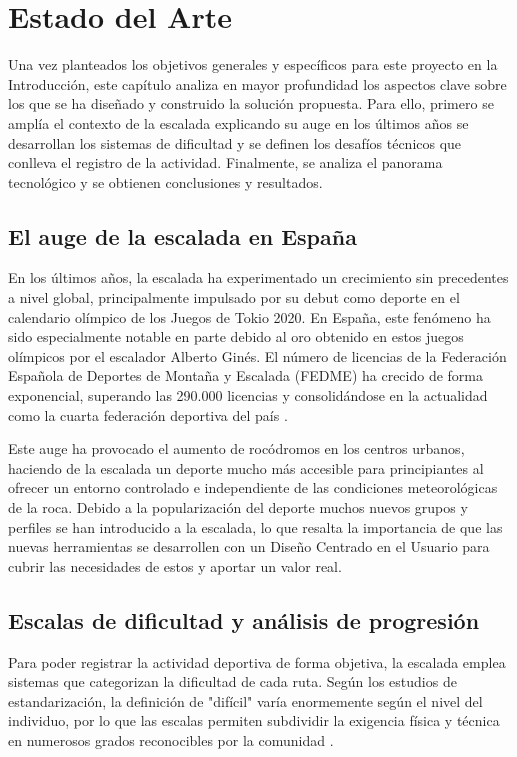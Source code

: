 \chapter{Estado del Arte}
\label{cap:estadoDelArte}

Una vez planteados los objetivos generales y específicos para este proyecto en la Introducción, este capítulo analiza en mayor profundidad los aspectos clave sobre los que se ha diseñado y construido la solución propuesta. Para ello, primero se amplía el contexto de la escalada explicando su auge en los últimos años se desarrollan los sistemas de dificultad y se definen los desafíos técnicos que conlleva el registro de la actividad. Finalmente, se analiza el panorama tecnológico y se obtienen conclusiones y resultados.

\section{El auge de la escalada en España}

En los últimos años, la escalada ha experimentado un crecimiento sin precedentes a nivel global, principalmente impulsado por su debut como deporte en el calendario olímpico de los Juegos de Tokio 2020. En España, este fenómeno ha sido especialmente notable en parte debido al oro obtenido en estos juegos olímpicos por el escalador Alberto Ginés. El número de licencias de la Federación Española de Deportes de Montaña y Escalada (FEDME) ha crecido de forma exponencial, superando las 290.000 licencias y consolidándose en la actualidad como la cuarta federación deportiva del país \citep{auge_escalada_levante}.

Este auge ha provocado el aumento de rocódromos en los centros urbanos, haciendo de la escalada un deporte mucho más accesible para principiantes al ofrecer un entorno controlado e independiente de las condiciones meteorológicas de la roca. Debido a la popularización del deporte muchos nuevos grupos y perfiles se han introducido a la escalada, lo que resalta la importancia de que las nuevas herramientas se desarrollen con un Diseño Centrado en el Usuario para cubrir las necesidades de estos y aportar un valor real.

\section{Escalas de dificultad y análisis de progresión}

Para poder registrar la actividad deportiva de forma objetiva, la escalada emplea sistemas que categorizan la dificultad de cada ruta. Según los estudios de estandarización, la definición de "difícil" varía enormemente según el nivel del individuo, por lo que las escalas permiten subdividir la exigencia física y técnica en numerosos grados reconocibles por la comunidad \citep{mandelli2019scales}.

